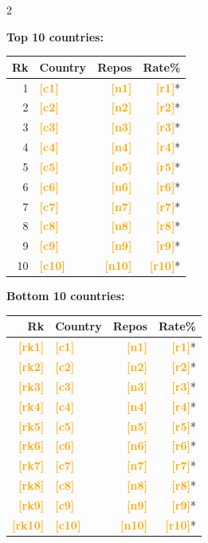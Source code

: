 \documentclass[10pt,a4paper]{article}
\newcommand{\FILLIN}[1]{\textcolor{orange}{\textbf{[#1]}}}
\begin{document}
\begin{multicols}{2}

\textbf{Top 10 countries:}

\begin{tabular}{@{}rlrr@{}}
\toprule
Rk & Country & Repos & Rate\% \\
\midrule
 1 & \FILLIN{c1}  & \FILLIN{n1}  & \FILLIN{r1}* \\
 2 & \FILLIN{c2}  & \FILLIN{n2}  & \FILLIN{r2}* \\
 3 & \FILLIN{c3}  & \FILLIN{n3}  & \FILLIN{r3}* \\
 4 & \FILLIN{c4}  & \FILLIN{n4}  & \FILLIN{r4}* \\
 5 & \FILLIN{c5}  & \FILLIN{n5}  & \FILLIN{r5}* \\
 6 & \FILLIN{c6}  & \FILLIN{n6}  & \FILLIN{r6}* \\
 7 & \FILLIN{c7}  & \FILLIN{n7}  & \FILLIN{r7}* \\
 8 & \FILLIN{c8}  & \FILLIN{n8}  & \FILLIN{r8}* \\
 9 & \FILLIN{c9}  & \FILLIN{n9}  & \FILLIN{r9}* \\
10 & \FILLIN{c10} & \FILLIN{n10} & \FILLIN{r10}* \\
\bottomrule
\end{tabular}

\columnbreak

\textbf{Bottom 10 countries:}

\begin{tabular}{@{}rlrr@{}}
\toprule
Rk & Country & Repos & Rate\% \\
\midrule
\FILLIN{rk1}  & \FILLIN{c1}  & \FILLIN{n1}  & \FILLIN{r1}* \\
\FILLIN{rk2}  & \FILLIN{c2}  & \FILLIN{n2}  & \FILLIN{r2}* \\
\FILLIN{rk3}  & \FILLIN{c3}  & \FILLIN{n3}  & \FILLIN{r3}* \\
\FILLIN{rk4}  & \FILLIN{c4}  & \FILLIN{n4}  & \FILLIN{r4}* \\
\FILLIN{rk5}  & \FILLIN{c5}  & \FILLIN{n5}  & \FILLIN{r5}* \\
\FILLIN{rk6}  & \FILLIN{c6}  & \FILLIN{n6}  & \FILLIN{r6}* \\
\FILLIN{rk7}  & \FILLIN{c7}  & \FILLIN{n7}  & \FILLIN{r7}* \\
\FILLIN{rk8}  & \FILLIN{c8}  & \FILLIN{n8}  & \FILLIN{r8}* \\
\FILLIN{rk9}  & \FILLIN{c9}  & \FILLIN{n9}  & \FILLIN{r9}* \\
\FILLIN{rk10} & \FILLIN{c10} & \FILLIN{n10} & \FILLIN{r10}* \\
\bottomrule
\end{tabular}

\end{multicols}
\end{document}
